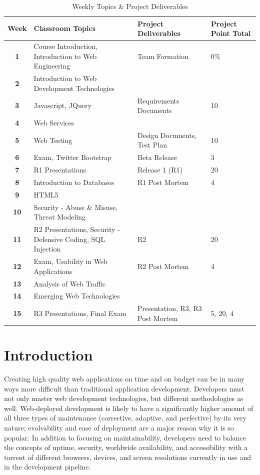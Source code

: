 \documentclass{sig-alternate}
\begin{document}
\begin{table}[t]
  \centering
  \caption{Weekly Topics \& Project Deliverables}
     \begin{tabular}{ c | l | l | l}
 \bfseries Week & \bfseries Classroom Topics & \bfseries Project Deliverables & \bfseries Project Point Total  \\ \hline \hline
	\bfseries 1 & Course Introduction, Introduction to Web Engineering & Team Formation & 0\%\\ \hline
	\bfseries 2 & Introduction to Web Development Technologies & \\ \hline
	\bfseries 3 & Javascript, JQuery & Requirements Documents & 10\\ \hline
	\bfseries 4 & Web Services & \\ \hline
	\bfseries 5 & Web Testing & Design Documents, Test Plan & 10\\ \hline
	\bfseries 6 & Exam, Twitter Bootstrap & Beta Release & 3\\ \hline
	\bfseries 7 & R1 Presentations & Release 1 (R1) & 20\\ \hline
	\bfseries 8 & Introduction to Databases & R1 Post Mortem & 4\\ \hline
	\bfseries 9 & HTML5 & \\ \hline
	\bfseries 10 & Security - Abuse \& Misuse,  Threat Modeling& \\ \hline
	\bfseries 11 & R2 Presentations,  Security - Defensive Coding, SQL Injection & R2 & 20\\ \hline
	\bfseries 12 & Exam, Usability in Web Applications & R2 Post Mortem & 4\\ \hline
	\bfseries 13 & Analysis of Web Traffic & \\ \hline
	\bfseries 14 & Emerging Web Technologies & \\ \hline
	\bfseries 15 & R3 Presentations, Final Exam & Presentation, R3, R3 Post Mortem & 5, 20, 4\\
  \end{tabular}
  \label{table:weeklytopics}

\end{table}

\section{Introduction}

Creating high quality web applications on time and on budget can be in many ways more difficult than traditional application development. Developers must not only master web development technologies, but different methodologies as well. Web-deployed development is likely to have a significantly higher amount of all three types of maintenance (corrective, adaptive, and perfective) by its very nature; evolvability and ease of deployment are a major reason why it is so popular. In addition to focusing on maintainability, developers need to balance the concepts of uptime, security, worldwide availability, and accessibility with a torrent of different browsers, devices, and screen resolutions currently in use and in the development pipeline.
\end{document}
